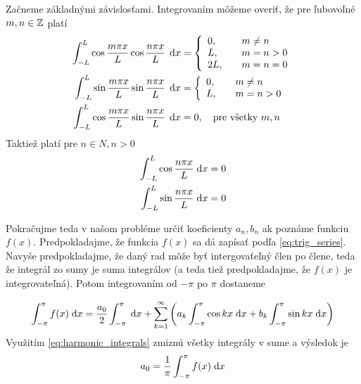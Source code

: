 Začneme základnými závislosťami. Integrovaním môžeme overiť, že pre
ľubovoľné $m,n \in \mathbb{Z}$ platí
\begin{equation}
\begin{split}
     \int_{-L}^{L} \cos \frac{m \pi x}{L} 
     \cos\frac{n \pi x}{L}\, \; \mathrm{d} x &= 
     \left\{
        \begin{array}{l l}
            0,& \quad m\not=n \\
            L,& \quad m=n>0 \\
            2L,& \quad m=n=0
        \end{array}
     \right. \\
     \int_{-L}^{L} \sin \frac{m \pi x}{L} 
     \sin\frac{n \pi x}{L}\, \; \mathrm{d} x &= 
     \left\{
        \begin{array}{l l}
            0,& \quad m\not=n \\
            L,& \quad m=n > 0
        \end{array}    
     \right. \\
     \int_{-L}^{L} \cos \frac{m \pi x}{L}
     \sin \frac{n \pi x}{L}\, \; \mathrm{d} x &= 0,
        \quad \text{pre všetky } m,n
        \label{eq:basic_orthogonality}
\end{split}
\end{equation}
Taktiež platí pre $n \in N, n>0$
\begin{equation}
\begin{split}
     \int_{-L}^{L} \cos \frac{n \pi x}{L} \; \mathrm{d} x = {}& 0\\
     \int_{-L}^{L} \sin \frac{n \pi x}{L} \; \mathrm{d} x = {}& 0 
    \label{eq:harmonic_integrals}
\end{split}    
\end{equation}


Pokračujme teda v našom probléme určiť koeficienty $a_n,b_n$ ak
poznáme funkciu $f(x)$.
Predpokladajme, že funkcia $f(x)$ sa dá zapísať podľa
\eqref{eq:trig_series}. Navyše predpokladajme, že daný rad môže byť
intergovaťeľný člen po člene, teda že integrál zo sumy je suma
integrálov (a teda tiež predpokladajme, že $f(x)$ je integrovateľná).
Potom integrovaním od $-\pi$ po $\pi$ dostaneme


\begin{equation*}
    \int_{-\pi}^{\pi} f(x) \; \mathrm{d} x = \frac{a_0}{2} \int_{-\pi}^{\pi} \; \mathrm{d} x +
        \sum_{k=1}^{\infty} \left( 
            a_k \int_{-\pi}^{\pi} \cos kx  \; \mathrm{d} x +
            b_k \int_{-\pi}^{\pi} \sin kx  \; \mathrm{d} x
        \right)
\end{equation*}
Využitím \eqref{eq:harmonic_integrals} zmiznú všetky integrály v sume a
výsledok je
\begin{equation*}
   a_0 = \frac{1}{\pi} \int_{-\pi}^{\pi} f(x) \; \mathrm{d} x 
\end{equation*}

